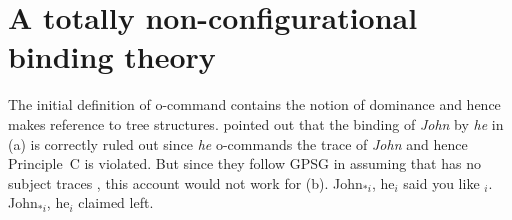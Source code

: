 \documentclass[output=paper
 	        ,biblatex
                ,babelshorthands
                ,newtxmath
                ,draftmode
                ,colorlinks, citecolor=brown
]{langscibook}
\begin{document}
\section{A totally non-configurational binding theory}
\label{sec-totally-non-configurational-BT}

The initial definition of o-command contains the notion of dominance and hence makes reference to
tree structures. \citet[]{ps2} pointed out that the binding of \emph{John} by \emph{he} in
(a) is correctly ruled out since \emph{he} o-commands the trace of \emph{John} and hence
Principle~C is violated. But since they follow GPSG in assuming that  has no subject traces
\citep[Chapter~4.4]{ps2}, this account would not work for (b). 
\eal
\label{ex-subject-object-extraction-traceless}
\ex John$_{*i}$, he$_i$ said you like \trace$_i$.
\ex John$_{*i}$, he$_i$ claimed left.
\zl
{}
\end{document}
